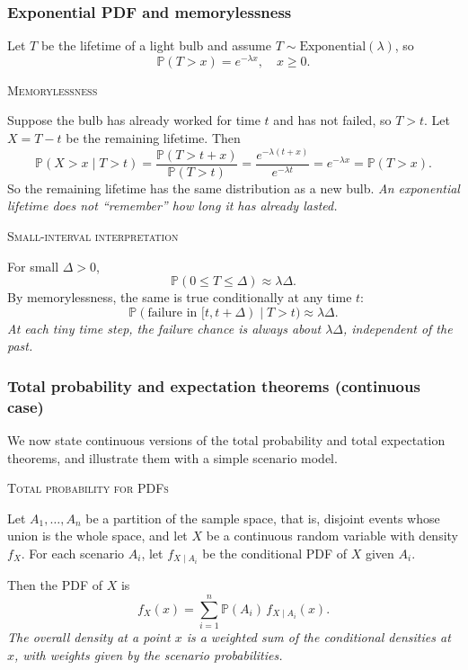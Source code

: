\subsubsection{Exponential PDF and memorylessness}

Let \(T\) be the lifetime of a light bulb and assume \(T \sim \text{Exponential}(\lambda)\), so
\[
\mathbb{P}(T > x) = e^{-\lambda x}, \quad x \ge 0.
\]

\bigskip\textsc{Memorylessness}

Suppose the bulb has already worked for time \(t\) and has not failed, so \(T>t\).  
Let \(X = T - t\) be the remaining lifetime. Then
\[
\mathbb{P}(X > x \mid T > t)
=
\frac{\mathbb{P}(T > t + x)}{\mathbb{P}(T > t)}
=
\frac{e^{-\lambda (t+x)}}{e^{-\lambda t}}
=
e^{-\lambda x}
=
\mathbb{P}(T > x).
\]
So the remaining lifetime has the same distribution as a new bulb.  
\textit{An exponential lifetime does not “remember” how long it has already lasted.}

\bigskip\textsc{Small-interval interpretation}

For small \(\Delta>0\),
\[
\mathbb{P}(0 \le T \le \Delta) \approx \lambda \Delta.
\]
By memorylessness, the same is true conditionally at any time \(t\):
\[
\mathbb{P}(\text{failure in }[t,t+\Delta) \mid T>t) \approx \lambda \Delta.
\]
\textit{At each tiny time step, the failure chance is always about \(\lambda \Delta\), independent of the past.}


\subsubsection{Total probability and expectation theorems (continuous case)}

We now state continuous versions of the total probability and total expectation theorems, and illustrate them with a simple scenario model.

\bigskip\textsc{Total probability for PDFs}

Let \(A_1,\dots,A_n\) be a partition of the sample space, that is, disjoint events whose union is the whole space, and let \(X\) be a continuous random variable with density \(f_X\).  
For each scenario \(A_i\), let \(f_{X\mid A_i}\) be the conditional PDF of \(X\) given \(A_i\).

Then the PDF of \(X\) is
\[
f_X(x) = \sum_{i=1}^n \mathbb{P}(A_i)\,f_{X\mid A_i}(x).
\]
\textit{The overall density at a point \(x\) is a weighted sum of the conditional densities at \(x\), with weights given by the scenario probabilities.}

